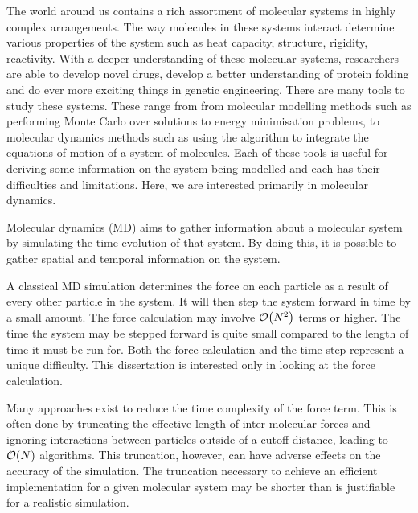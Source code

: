 %
%

%
The world around us contains
a rich assortment of molecular systems in
highly complex arrangements.
%
The way molecules in these systems interact determine various properties
of the system such as heat capacity, structure, rigidity, reactivity.
%
With a deeper understanding of these molecular systems,
researchers are able to develop novel drugs,
develop a better understanding of protein folding and
do ever more exciting things in genetic engineering.
%
There are many tools to study these systems.
These range from from molecular modelling methods such as performing
Monte Carlo over solutions to energy minimisation problems,
to molecular dynamics methods such as using the \velocityverlet{}
algorithm to integrate the equations of motion of a system of molecules.
%
Each of these tools is useful for
deriving some information on the system being modelled and
each has their difficulties and limitations.
%
Here, we are interested primarily in molecular dynamics.


%
Molecular dynamics (MD) aims to
gather information about a molecular system by
simulating the time evolution of that system.
%
By doing this, it is possible to
gather spatial and temporal information on the system.


%
A classical MD simulation determines
the force on each particle as a result of
every other particle in the system.
%
It will then step the system forward in time by a small amount.
%
The force calculation may involve $\mathcal{O}{\left({ N^2 }\right)}$ terms or higher.
%
The time the system may be stepped forward is
quite small compared to the length of time it must be run for.
%
Both the force calculation and the time step represent a unique difficulty.
%
This dissertation is interested only in looking at the force calculation.


Many approaches exist to reduce the time complexity of
the force term.
%
This is often done by truncating the effective length of inter-molecular
forces and ignoring interactions between particles outside of a
cutoff distance,
leading to $\mathcal{O}{\left({ N }\right)}$ algorithms.
%
This truncation, however, can have adverse effects on the accuracy
of the simulation.
%
The truncation necessary to achieve an efficient implementation
for a given molecular system may be
shorter than is justifiable for a realistic simulation.

